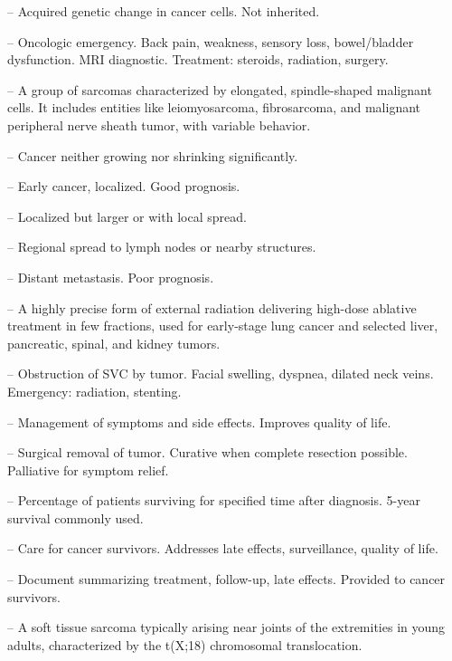 -- Acquired genetic change in cancer cells. Not inherited.

-- Oncologic emergency. Back pain, weakness, sensory loss, bowel/bladder dysfunction. MRI diagnostic. Treatment: steroids, radiation, surgery.

-- A group of sarcomas characterized by elongated, spindle-shaped malignant cells. It includes entities like leiomyosarcoma, fibrosarcoma, and malignant peripheral nerve sheath tumor, with variable behavior.

-- Cancer neither growing nor shrinking significantly.

-- Early cancer, localized. Good prognosis.

-- Localized but larger or with local spread.

-- Regional spread to lymph nodes or nearby structures.

-- Distant metastasis. Poor prognosis.

-- A highly precise form of external radiation delivering high-dose ablative treatment in few fractions, used for early-stage lung cancer and selected liver, pancreatic, spinal, and kidney tumors.

-- Obstruction of SVC by tumor. Facial swelling, dyspnea, dilated neck veins. Emergency: radiation, stenting.

-- Management of symptoms and side effects. Improves quality of life.

-- Surgical removal of tumor. Curative when complete resection possible. Palliative for symptom relief.

-- Percentage of patients surviving for specified time after diagnosis. 5-year survival commonly used.

-- Care for cancer survivors. Addresses late effects, surveillance, quality of life.

-- Document summarizing treatment, follow-up, late effects. Provided to cancer survivors.

-- A soft tissue sarcoma typically arising near joints of the extremities in young adults, characterized by the t(X;18) chromosomal translocation.

